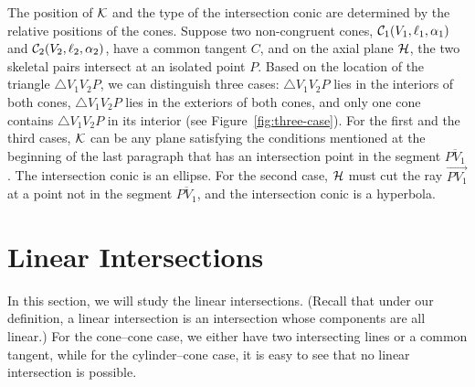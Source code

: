      The position of ${\cal K}$ and the type of the intersection conic are
determined by the relative positions of the cones. Suppose two 
non-congruent cones, ${\cal C}_1(V_1,\ell_1,\alpha_1)$ and
${\cal C}_2(V_2,\ell_2,\alpha_2)$, have a common tangent $C$, and on the axial 
plane ${\cal H}$, the two skeletal pairs intersect at an isolated point $P$.
Based on the location of the triangle $\bigtriangleup V_1V_2P$, we can
distinguish three cases: $\bigtriangleup V_1V_2P$ lies in the interiors of both
cones, $\bigtriangleup V_1V_2P$ lies in the exteriors of both cones, and
only one cone contains $\bigtriangleup V_1V_2P$ in its interior
(see Figure~\ref{fig:three-case}).  For the first and the third cases, 
${\cal K}$ can be any plane satisfying the conditions mentioned at the 
beginning of the last paragraph that has an intersection point in the segment
$\overline{PV_1}$.  The intersection conic is an ellipse.  For the second 
case, ${\cal H}$ must cut the ray $\stackrel{\longrightarrow}{PV_1}$ at a point
not in the segment $\overline{PV_1}$, and the intersection conic is a 
hyperbola.


\section{Linear Intersections}
\label{section:linear}
     In this section, we will study the linear intersections. (Recall that
under our definition, a linear intersection is an intersection whose components
are all linear.) For the cone--cone case, we either have two intersecting
lines or a common tangent, while for the cylinder--cone case, it is easy to
see that no linear intersection is possible.

